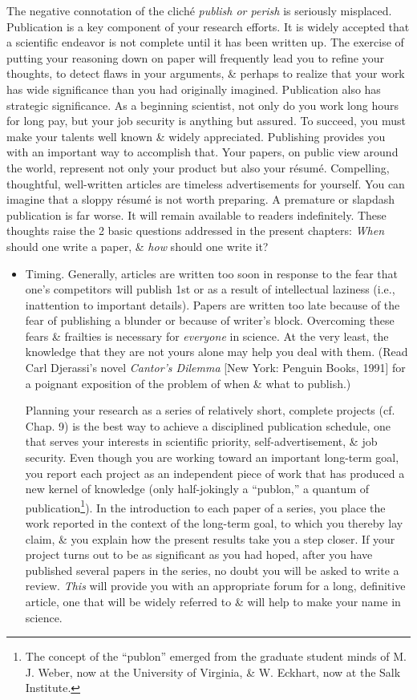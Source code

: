 \documentclass{article}
\begin{document}
\begin{enumerate}
\begin{itemize}
		The negative connotation of the clich\'e  \textit{publish or perish} is seriously misplaced. Publication is a key component of your research efforts. It is widely accepted that a scientific endeavor is not complete until it has been written up. The exercise of putting your reasoning down on paper will frequently lead you to refine your thoughts, to detect flaws in your arguments, \& perhaps to realize that your work has wide significance than you had originally imagined. Publication also has strategic significance. As a beginning scientist, not only do you work long hours for long pay, but your job security is anything but assured. To succeed, you must make your talents well known \& widely appreciated. Publishing provides you with an important way to accomplish that. Your papers, on public view around the world, represent not only your product but also your r\'esum\'e. Compelling, thoughtful, well-written articles are timeless advertisements for yourself. You can imagine that a sloppy r\'esum\'e is not worth preparing. A premature or slapdash publication is far worse. It will remain available to readers indefinitely. These thoughts raise the 2 basic questions addressed in the present chapters: \textit{When} should one write a paper, \& \textit{how} should one write it?
		\begin{itemize}
			\item {\sf Timing.} Generally, articles are written too soon in response to the fear that one's competitors will publish 1st or as a result of intellectual laziness (i.e., inattention to important details). Papers are written too late because of the fear of publishing a blunder or because of writer's block. Overcoming these fears \& frailties is necessary for \textit{everyone} in science. At the very least, the knowledge that they are not yours alone may help you deal with them. (Read Carl Djerassi's novel \textit{Cantor's Dilemma} [New York: Penguin Books, 1991] for a poignant exposition of the problem of when \& what to publish.)
			
			Planning your research as a series of relatively short, complete projects (cf. Chap. 9) is the best way to achieve a disciplined publication schedule, one that serves your interests in scientific priority, self-advertisement, \& job security. Even though you are working toward an important long-term goal, you report each project as an independent piece of work that has produced a new kernel of knowledge (only half-jokingly a ``publon,'' a quantum of publication\footnote{The concept of the ``publon'' emerged from the graduate student minds of M. J. Weber, now at the University of Virginia, \& W. Eckhart, now at the Salk Institute.}). In the introduction to each paper of a series, you place the work reported in the context of the long-term goal, to which you thereby lay claim, \& you explain how the present results take you a step closer. If your project turns out to be as significant as you had hoped, after you have published several papers in the series, no doubt you will be asked to write a review. \textit{This} will provide you with an appropriate forum for a long, definitive article, one that will be widely referred to \& will help to make your name in science.
			

\end{itemize}
\end{itemize}
\end{enumerate}
\end{document}
